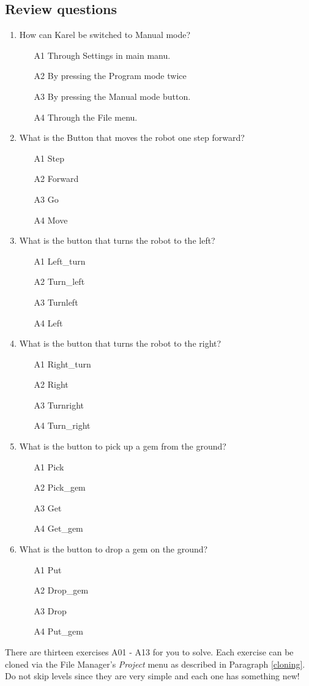 \documentclass[article,A4,12pt]{llncs}
\begin{document}
\subsection{Review questions}

\begin{enumerate}
\item How can Karel be switched to Manual mode?
\begin{enumerate}
\item[A1] Through Settings in main manu.
\item[A2] By pressing the Program mode twice
\item[A3] By pressing the Manual mode button.
\item[A4] Through the File menu.
\end{enumerate}
\item What is the Button that moves the robot one step forward?
\begin{enumerate}
\item[A1] Step
\item[A2] Forward
\item[A3] Go
\item[A4] Move
\end{enumerate}
\item What is the button that turns the robot to the left?
\begin{enumerate}
\item[A1] Left\_turn
\item[A2] Turn\_left
\item[A3] Turnleft
\item[A4] Left
\end{enumerate}
\item What is the button that turns the robot to the right?
\begin{enumerate}
\item[A1] Right\_turn
\item[A2] Right
\item[A3] Turnright
\item[A4] Turn\_right
\end{enumerate}
\item What is the button to pick up a gem from the ground?
\begin{enumerate}
\item[A1] Pick
\item[A2] Pick\_gem
\item[A3] Get
\item[A4] Get\_gem
\end{enumerate}
\item What is the button to drop a gem on the ground?
\begin{enumerate}
\item[A1] Put
\item[A2] Drop\_gem
\item[A3] Drop 
\item[A4] Put\_gem
\end{enumerate}
\end{enumerate}
There are thirteen exercises A01 - A13 for you to solve.
Each exercise can be cloned via the File Manager's 
{\em Project} menu as described in Paragraph \ref{cloning}. 
Do not skip levels since they are very simple and each one has something new! 
\end{document}
